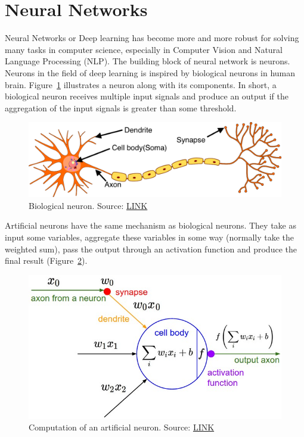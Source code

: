 \documentclass[3p, sort&compress, 12pt]{elsarticle}
\begin{document}
\section{Neural Networks}
Neural Networks or Deep learning has become more and more robust for solving many tasks in computer science, especially in Computer Vision and Natural Language Processing (NLP). The building block of neural network is neurons. Neurons in the field of deep learning is inspired by biological neurons in human brain. Figure~\ref{fig:2:01} illustrates a neuron along with its components. In short, a biological neuron receives multiple input signals and produce an output if the aggregation of the input signals is greater than some threshold. 
\begin{figure}[!htbp]
	\centering
	\includegraphics[scale=.25]{images/biological_neuron.png}
	\caption{Biological neuron. Source: \href{https://smhatre59.medium.com/what-is-the-relation-between-artificial-and-biological-neuron-18b05831036}{LINK}}
	\label{fig:2:01}
\end{figure}
\par Artificial neurons have the same mechanism as biological neurons. They take as input  some variables, aggregate these variables in some way (normally take the weighted sum), pass the output through an activation function and produce the final result (Figure~\ref{fig:2:02}).
\begin{figure}[!htbp]
	\centering
	\includegraphics[scale=0.4]{images/activation.jpg}
	\caption{Computation of an artificial neuron. Source: \href{https://ichi.pro/vi/chuc-nang-kich-hoat-tat-ca-nhung-gi-ban-can-biet-58662895551070}{LINK}}
	\label{fig:2:02}
\end{figure}
\end{document}
